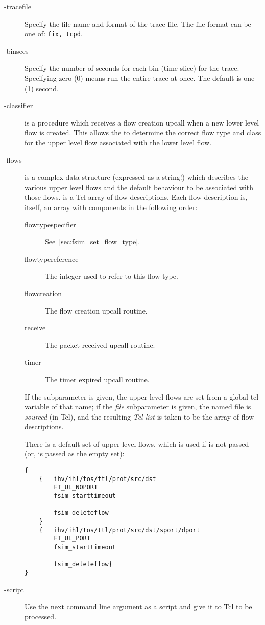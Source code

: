 \documentclass{article}
\begin{document}
\begin{description}
\item[-tracefile] Specify the file name and format of the trace file.  The
file format can be one of: \texttt{fix, tcpd}.
\item[-binsecs] Specify the number of seconds for each bin (time slice)
for the trace.  Specifying zero (0) means run the entire trace at once.
The default is one (1) second.
\item[-classifier]  is a procedure which receives a
flow creation upcall when a new lower level flow is created.  This
allows the  to determine the correct flow type and
class for the upper level flow associated with the lower level flow.
\item[-flows]   is a complex data structure (expressed
as a string!) which describes the various upper level flows and the
default behaviour to be associated with those flows.  
is a Tcl array of flow descriptions.  Each flow description is, itself,
an array with components in the following order:
\begin{description}
\item[flowtypespecifier] See~\ref{sec:fsim_set_flow_type}.
\item[flowtypereference] The integer used to refer to this flow type.
\item[flowcreation] The flow creation upcall routine.
\item[receive] The packet received upcall routine.
\item[timer] The timer expired upcall routine.
\end{description}
If the  subparameter is given, the upper level flows are
set from a global tcl variable of that name; if the \emph{file}
subparameter is given, the named file is \emph{sourced} (in Tcl), and
the resulting \emph{Tcl list} is taken to be the array of flow
descriptions.

There is a default set of upper level flows, which is used if
 is not passed (or, is passed as the empty set):
\begin{verbatim}
{
    {   ihv/ihl/tos/ttl/prot/src/dst
        FT_UL_NOPORT
        fsim_starttimeout
        -
        fsim_deleteflow
    }
    {	ihv/ihl/tos/ttl/prot/src/dst/sport/dport
        FT_UL_PORT
        fsim_starttimeout
        -
        fsim_deleteflow}
}
\end{verbatim}
\item[-script] Use the next command line argument as a script and give
it to Tcl to be processed.
\end{description}
\end{document}

